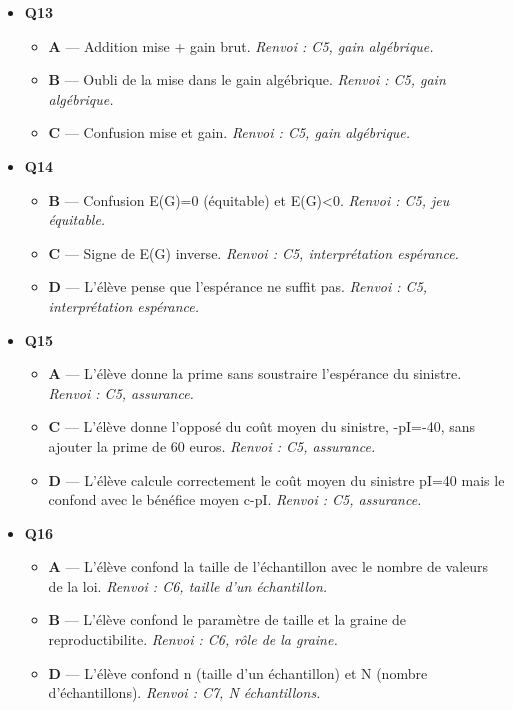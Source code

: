 \begin{itemize}
\begin{itemize}
  \end{itemize}
  \item \textbf{Q13}
  \begin{itemize}
    \item \textbf{A} — Addition mise + gain brut. \emph{Renvoi : C5, gain algébrique.}
    \item \textbf{B} — Oubli de la mise dans le gain algébrique. \emph{Renvoi : C5, gain algébrique.}
    \item \textbf{C} — Confusion mise et gain. \emph{Renvoi : C5, gain algébrique.}
  \end{itemize}
  \item \textbf{Q14}
  \begin{itemize}
    \item \textbf{B} — Confusion E(G)=0 (équitable) et E(G)<0. \emph{Renvoi : C5, jeu équitable.}
    \item \textbf{C} — Signe de E(G) inverse. \emph{Renvoi : C5, interprétation espérance.}
    \item \textbf{D} — L'élève pense que l'espérance ne suffit pas. \emph{Renvoi : C5, interprétation espérance.}
  \end{itemize}
  \item \textbf{Q15}
  \begin{itemize}
    \item \textbf{A} — L'élève donne la prime sans soustraire l'espérance du sinistre. \emph{Renvoi : C5, assurance.}
    \item \textbf{C} — L'élève donne l'opposé du coût moyen du sinistre, -pI=-40, sans ajouter la prime de 60 euros. \emph{Renvoi : C5, assurance.}
    \item \textbf{D} — L'élève calcule correctement le coût moyen du sinistre pI=40 mais le confond avec le bénéfice moyen c-pI. \emph{Renvoi : C5, assurance.}
  \end{itemize}
  \item \textbf{Q16}
  \begin{itemize}
    \item \textbf{A} — L'élève confond la taille de l'échantillon avec le nombre de valeurs de la loi. \emph{Renvoi : C6, taille d'un échantillon.}
    \item \textbf{B} — L'élève confond le paramètre de taille et la graine de reproductibilite. \emph{Renvoi : C6, rôle de la graine.}
    \item \textbf{D} — L'élève confond n (taille d'un échantillon) et N (nombre d'échantillons). \emph{Renvoi : C7, N échantillons.}
  \end{itemize}

\end{itemize}
